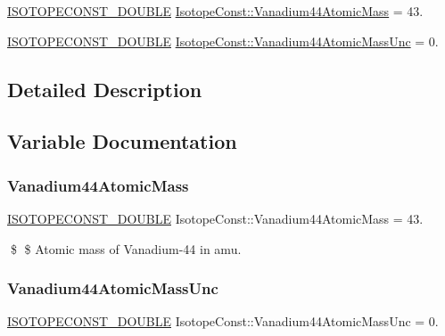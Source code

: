 \begin{DoxyCompactItemize}
\item 
\mbox{\hyperlink{group___isotope_const-_macros_ga8f45a7272ce02c0b4c65c44636ed719a}{I\+S\+O\+T\+O\+P\+E\+C\+O\+N\+S\+T\+\_\+\+D\+O\+U\+B\+LE}} \mbox{\hyperlink{group___isotope_const-_vanadium-_v44_gaf76fda5fa16029d1bf7b0c32d08fed16}{Isotope\+Const\+::\+Vanadium44\+Atomic\+Mass}} = 43.
\item 
\mbox{\hyperlink{group___isotope_const-_macros_ga8f45a7272ce02c0b4c65c44636ed719a}{I\+S\+O\+T\+O\+P\+E\+C\+O\+N\+S\+T\+\_\+\+D\+O\+U\+B\+LE}} \mbox{\hyperlink{group___isotope_const-_vanadium-_v44_ga480b74ab31fb14531e3b8e5b7e1d18ae}{Isotope\+Const\+::\+Vanadium44\+Atomic\+Mass\+Unc}} = 0.
\end{DoxyCompactItemize}


\subsection{Detailed Description}


\subsection{Variable Documentation}
\mbox{\label{group___isotope_const-_vanadium-_v44_gaf76fda5fa16029d1bf7b0c32d08fed16}} 
\subsubsection{\texorpdfstring{Vanadium44\+Atomic\+Mass}{Vanadium44AtomicMass}}
{\footnotesize\ttfamily \mbox{\hyperlink{group___isotope_const-_macros_ga8f45a7272ce02c0b4c65c44636ed719a}{I\+S\+O\+T\+O\+P\+E\+C\+O\+N\+S\+T\+\_\+\+D\+O\+U\+B\+LE}} Isotope\+Const\+::\+Vanadium44\+Atomic\+Mass = 43.}

\$ \$ Atomic mass of Vanadium-\/44 in amu. \mbox{\label{group___isotope_const-_vanadium-_v44_ga480b74ab31fb14531e3b8e5b7e1d18ae}} 
\subsubsection{\texorpdfstring{Vanadium44\+Atomic\+Mass\+Unc}{Vanadium44AtomicMassUnc}}
{\footnotesize\ttfamily \mbox{\hyperlink{group___isotope_const-_macros_ga8f45a7272ce02c0b4c65c44636ed719a}{I\+S\+O\+T\+O\+P\+E\+C\+O\+N\+S\+T\+\_\+\+D\+O\+U\+B\+LE}} Isotope\+Const\+::\+Vanadium44\+Atomic\+Mass\+Unc = 0.}

